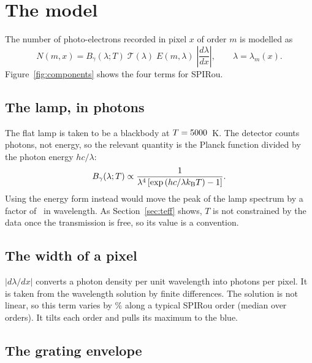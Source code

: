 \documentclass[11pt,a4paper]{article}
\begin{document}
\section{The model}
\label{sec:model}

The number of photo-electrons recorded in pixel $x$ of order $m$ is modelled as
\begin{equation}
N(m,x) = B_\gamma(\lambda;T)\;\mathcal{T}(\lambda)\;E(m,\lambda)\;\left|\frac{d\lambda}{dx}\right|,
\qquad \lambda = \lambda_m(x).
\label{eq:model}
\end{equation}
Figure~\ref{fig:components} shows the four terms for SPIRou.

\subsection{The lamp, in photons}

The flat lamp is taken to be a blackbody at $T = 5000$~K. The detector counts photons, not energy, so the relevant quantity is the Planck function divided by the photon energy $hc/\lambda$:
\begin{equation}
B_\gamma(\lambda;T) \propto \frac{1}{\lambda^4\left[\exp\left(hc/\lambda k_{\rm B} T\right)-1\right]}.
\end{equation}
Using the energy form instead would move the peak of the lamp spectrum by a factor of \PeakRatio\ in wavelength. As Section~\ref{sec:teff} shows, $T$ is not constrained by the data once the transmission is free, so its value is a convention.

\subsection{The width of a pixel}

$|d\lambda/dx|$ converts a photon density per unit wavelength into photons per pixel. It is taken from the wavelength solution by finite differences. The solution is not linear, so this term varies by \spDwaveVar\% along a typical SPIRou order (median over orders). It tilts each order and pulls its maximum to the blue.

\subsection{The grating envelope}
\label{sec:envelope}
\end{document}
